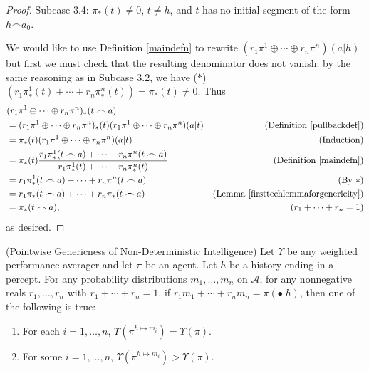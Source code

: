 \documentclass[runningheads]{llncs}
\begin{document}
\begin{proof}
    Subcase 3.4: $\pi_*(t)\not=0$, $t\not=h$, and $t$ has no initial segment
        of the form $h\frown a_0$.

    We would like to use Definition \ref{maindefn} to rewrite
    $(r_1\pi^1\oplus\cdots\oplus r_n\pi^n)(a|h)$ but first we must
    check that the resulting denominator does not vanish:
    by the same reasoning as in Subcase 3.2, we have
    ($*$) $(r_1\pi^1_*(t)+\cdots+r_n\pi^n_*(t))=\pi_*(t)\not=0$.
    Thus
    \begin{align*}
        &{} (r_1\pi^1\oplus\cdots\oplus r_n\pi^n)_*(t\frown a)\\
            &= (r_1\pi^1\oplus\cdots\oplus r_n\pi^n)_*(t)
                (r_1\pi^1\oplus\cdots\oplus r_n\pi^n)(a|t)
                    &\mbox{(Definition \ref{pullbackdef})}\\
            &= \pi_*(t)(r_1\pi^1\oplus\cdots\oplus r_n\pi^n)(a|t)
                    &\mbox{(Induction)}\\
            &= \pi_*(t)\frac{r_1\pi^1_*(t\frown a)+\cdots+r_n\pi^n(t\frown a)}
                {r_1\pi^1_*(t)+\cdots+r_n\pi^n_*(t)}
                    &\mbox{(Definition \ref{maindefn})}\\
            &= r_1\pi^1_*(t\frown a)+\cdots+r_n\pi^n(t\frown a)
                    &\mbox{(By $*$)}\\
            &= r_1\pi_*(t\frown a)+\cdots+r_n\pi_*(t\frown a)
                    &\mbox{(Lemma \ref{firsttechlemmaforgenericity})}\\
            &= \pi_*(t\frown a),
                    &\mbox{($r_1+\cdots+r_n=1$)}
    \end{align*}
    as desired.
\end{proof}

\begin{theorem}
\label{pointwisegenericnessthm}
    (Pointwise Genericness of Non-Deterministic Intelligence)
    Let $\Upsilon$ be any weighted performance averager and let
    $\pi$ be an agent.
    Let $h$ be a history ending in a percept.
    For any probability distributions $m_1,\ldots,m_n$ on $\mathcal A$,
    for any nonnegative reals $r_1,\ldots,r_n$ with $r_1+\cdots+r_n=1$,
    if $r_1m_1+\cdots+r_nm_n=\pi(\bullet|h)$,
    then one of the following is true:
    \begin{enumerate}
        \item For each $i=1,\ldots,n$, $\Upsilon(\pi^{h\mapsto m_i})=\Upsilon(\pi)$.
        \item For some $i=1,\ldots,n$, $\Upsilon(\pi^{h\mapsto m_i})>\Upsilon(\pi)$.
    \end{enumerate}
\end{theorem}
\end{document}
